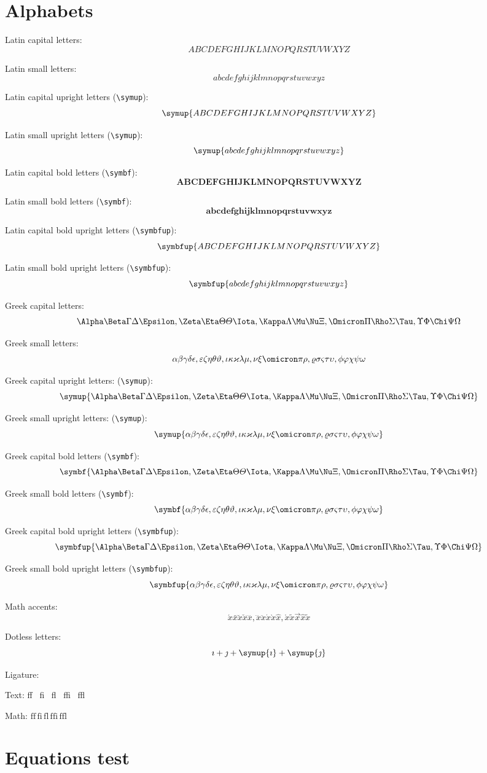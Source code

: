 \documentclass{article}
\def\Latinalphabets{ABCDEFGHIJKLMNOPQRSTUVWXYZ}
\def\latinalphabets{abcdefghijklmnopqrstuvwxyz}
\def\Greekalphabets{
  \Alpha      \Beta       \Gamma      \Delta      \Epsilon   ,
  \Zeta       \Eta        \Theta      \varTheta   \Iota      ,
  \Kappa      \Lambda     \Mu         \Nu         \Xi        ,
  \Omicron    \Pi         \Rho        \Sigma      \Tau       ,
  \Upsilon    \Phi        \Chi        \Psi        \Omega
}
\def\greekalphabets{
  \alpha      \beta       \gamma      \delta      \epsilon   ,
  \varepsilon \zeta       \eta        \theta      \vartheta  ,
  \iota       \kappa      \varkappa   \lambda     \mu        ,
  \nu         \xi         \omicron    \pi         \rho       ,
  \varrho     \sigma      \varsigma   \tau        \upsilon   ,
  \phi        \varphi     \chi        \psi        \omega
}
\def\ligaturetext{ff \, fi \, fl \, ffi \, ffl}
\begin{document}
\section{Alphabets}

Latin capital letters:
\[ \Latinalphabets \]

Latin small letters:
\[ \latinalphabets \]

Latin capital upright letters (\verb|\symup|):
\[ \symup{\Latinalphabets} \]

Latin small upright letters (\verb|\symup|):
\[ \symup{\latinalphabets} \]

Latin capital bold letters (\verb|\symbf|):
\[ \symbf{\Latinalphabets} \]

Latin small bold letters (\verb|\symbf|):
\[ \symbf{\latinalphabets} \]

Latin capital bold upright letters (\verb|\symbfup|):
\[ \symbfup{\Latinalphabets} \]

Latin small bold upright letters (\verb|\symbfup|):
\[ \symbfup{\latinalphabets} \]

Greek capital letters:
\[ \Greekalphabets \]

Greek small letters:
\[ \greekalphabets \]

Greek capital upright letters: (\verb|\symup|):
\[ \symup{\Greekalphabets} \]

Greek small upright letters: (\verb|\symup|):
\[ \symup{\greekalphabets} \]

Greek capital bold letters (\verb|\symbf|):
\[ \symbf{\Greekalphabets} \]

Greek small bold letters (\verb|\symbf|):
\[ \symbf{\greekalphabets} \]

Greek capital bold upright letters (\verb|\symbfup|):
\[ \symbfup{\Greekalphabets} \]

Greek small bold upright letters (\verb|\symbfup|):
\[ \symbfup{\greekalphabets} \]

Math accents:
\[
  \acute{x}     \bar{x}     \breve{x}   \check{x}     \ddddot{x}      ,
  \dddot{x}     \ddot{x}    \dot{x}     \grave{x}     \hat{x}         ,
  \mathring{x}  \tilde{x}   \vec{x}     \widehat{x}   \widetilde{x}
\]

Dotless letters:
\[ \imath + \jmath + \symup{\imath} + \symup{\jmath} \]

Ligature:

Text: {\firatext\ligaturetext}

Math: $\mathrm{\ligaturetext}$

\section{Equations test}
\end{document}
